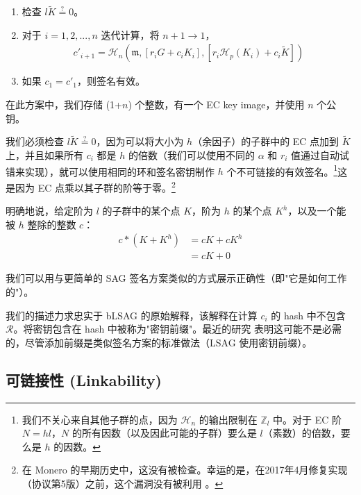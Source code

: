 \begin{enumerate}
    \item 检查 $l \tilde{K} \stackrel{?}{=} 0$。
	\item 对于 \(i = 1, 2, ..., n\) 迭代计算，将 \(n + 1 \rightarrow 1\)，\vspace{.175cm}
	\begin{align*}
	c'_{i+1} = \mathcal{H}_n(\mathfrak{m}, [r_i G + c_i {K_i}], [r_i \mathcal{H}_p(K_i) + c_i \tilde{K}])
	\end{align*}

	\item 如果 \(c_1 = c'_1\)，则签名有效。
\end{enumerate}

在此方案中，我们存储 (1+$n$) 个整数，有一个 EC key image，并使用 $n$ 个公钥。

我们必须检查 $l \tilde{K} \stackrel{?}{=} 0$，因为可以将大小为 $h$（余因子）的子群中的 EC 点加到 $\tilde{K}$ 上，并且如果所有 $c_i$ 都是 $h$ 的倍数（我们可以使用不同的 $\alpha$ 和 $r_i$ 值通过自动试错来实现），就可以使用相同的环和签名密钥制作 $h$ 个不可链接的有效签名。\footnote{我们不关心来自其他子群的点，因为 $\mathcal{H}_n$ 的输出限制在 $\mathbb{Z}_l$ 中。对于 EC 阶 $N = h l$，$N$ 的所有因数（以及因此可能的子群）要么是 $l$（素数）的倍数，要么是 $h$ 的因数。}这是因为 EC 点乘以其子群的阶等于零。\footnote{在 Monero 的早期历史中，这没有被检查。幸运的是，在2017年4月修复实现（协议第5版）之前，这个漏洞没有被利用 \cite{key-image-bug}。}

明确地说，给定阶为 $l$ 的子群中的某个点 $K$，阶为 $h$ 的某个点 $K^h$，以及一个能被 $h$ 整除的整数 $c$：
\begin{align*}
    c*(K + K^h) &= cK + cK^h\\
                &= cK + 0
\end{align*}

我们可以用与更简单的 SAG 签名方案类似的方式展示正确性（即"它是如何工作的"）。

我们的描述力求忠实于 bLSAG 的原始解释，该解释在计算 $c_i$ 的 hash 中不包含 $\mathcal{R}$。将密钥包含在 hash 中被称为"密钥前缀"。最近的研究 \cite{key-prefix-paper} 表明这可能不是必需的，尽管添加前缀是类似签名方案的标准做法（LSAG 使用密钥前缀）。


\subsection*{可链接性 (Linkability)}

